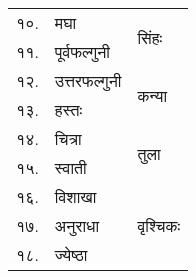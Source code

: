 {\begin{tabular}{|l|l|l|}
\cline{3-3}\cline{1-2}\multirow{4}{*}{१०.} & \multirow{4}{*}{मघा}                      & \multirow{9}{*}{सिंहः}\\
\\
\\
\\
\cline{1-2}\multirow{4}{*}{११.} & \multirow{4}{*}{पूर्वफल्गुनी}             & \\
\\
\\
\\
\cline{1-2}\multirow{4}{*}{१२.} & \multirow{4}{*}{उत्तरफल्गुनी}             & \\
\cline{3-3} & & \multirow{9}{*}{कन्या} \\
\\
\\
\cline{1-2}\multirow{4}{*}{१३.} & \multirow{4}{*}{हस्तः}                    & \\
\\
\\
\\
\cline{1-2}\multirow{4}{*}{१४.} & \multirow{4}{*}{चित्रा}                   &  \\
\\
\cline{3-3} & & \multirow{9}{*}{तुला} \\
\\
\cline{1-2}\multirow{4}{*}{१५.} & \multirow{4}{*}{स्वाती}                   &  \\
\\
\\
\\
\cline{1-2}\multirow{4}{*}{१६.} & \multirow{4}{*}{विशाखा}                   &  \\
\\
\\
\cline{3-3} & & \multirow{9}{*}{वृश्चिकः}\\
\cline{1-2}\multirow{4}{*}{१७.} & \multirow{4}{*}{अनुराधा}                  &  \\
\\
\\
\\
\cline{1-2}\multirow{4}{*}{१८.} & \multirow{4}{*}{ज्येष्ठा}                 &  \\
\\
\\
\\\hline
\end{tabular}

}

